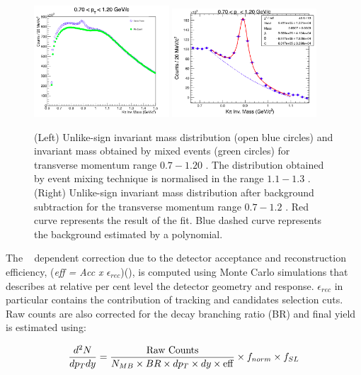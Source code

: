 \begin{figure}[t]
\includegraphics[width=0.45\textwidth]{Images/Chapter4/1mix.png}
\includegraphics[width=0.48\textwidth]{Images/Chapter4/2sig.png}
\caption{(Left) Unlike-sign invariant mass distribution (open blue circles) and invariant mass obtained by mixed events (green circles) for transverse momentum range $0.7-1.20$ \GeVc. The distribution obtained by event mixing technique is normalised in the range $1.1- 1.3$ \GeVcSq. (Right) Unlike-sign invariant mass distribution after background subtraction for the transverse momentum range $0.7-1.2$ \GeVc. Red curve represents the result of the fit. Blue dashed curve represents the background estimated by a polynomial.}
\label{Fig:chap4-4.1}
\end{figure}

The \pT~ dependent correction due to the detector acceptance and reconstruction efficiency, (\emph{\rm{eff} = \rm{Acc} x $\epsilon_{rec}$})(\pT), is computed using Monte Carlo simulations that describes at relative per cent level the detector geometry and response. $\epsilon_{rec}$ in particular contains the contribution of tracking and candidates selection cuts. Raw counts are also corrected for the decay branching ratio (BR) and final yield is estimated using:

\begin{equation}
\label{Eq:4-4.1}
\frac{d^{2}N}{dp_{T}dy} = \frac{\text{Raw Counts}}{N_{MB} \times BR \times dp_{T} \times dy \times \rm{eff}} \times f_{norm} \times f_{SL}
\end{equation}


